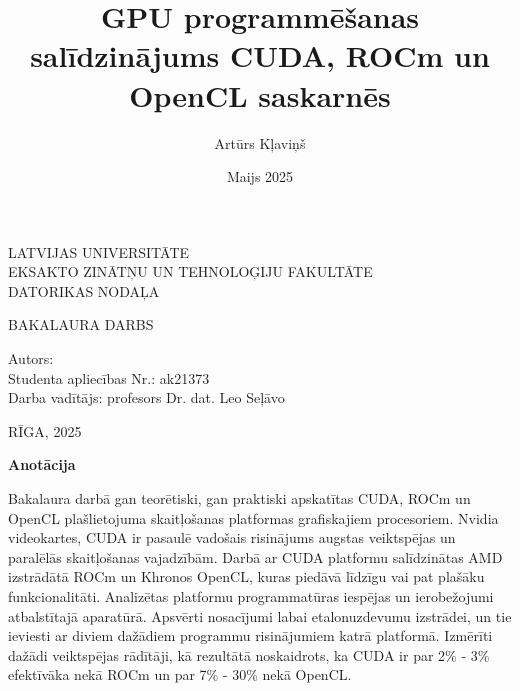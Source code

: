 \documentclass[12pt]{report}%
\author{Artūrs Kļaviņš}
\title{GPU programmēšanas salīdzinājums CUDA, ROCm un OpenCL saskarnēs}
\date{Maijs 2025}
\theoremstyle{definition}
\def\degree{Bakalaura darbs}
\def\faculty{Eksakto zinātņu un tehnoloģiju fakultāte}
\def\department{Datorikas nodaļa}
\def\vietlaiks{Rīga, 2025}
\def\supervisor{Darba vadītājs: profesors Dr. dat. Leo Seļāvo}
\def\studaplieciba{ak21373}
\begin{document}
\thispagestyle{empty}
\makeatletter
   \begin{center}
       \vspace*{1cm}
        
    \vspace{10mm}
    {\Large LATVIJAS UNIVERSITĀTE\\
    \MakeUppercase{\faculty}\\
    \vspace{2mm}
    \MakeUppercase{\department}
    }
    \vspace*{10mm}
    
    
    
    \vspace{5mm}
    {\Large \MakeUppercase{\textbf{\@title}}}
    \vspace{5mm}
    

       \vspace{1cm}
    \Large
    \MakeUppercase{\degree}
    \end{center}
    \vspace{3cm}
    \begin{flushleft}
    \large
       Autors: \textbf{\large \@author}\\
       Studenta apliecības Nr.: \studaplieciba \\
       \supervisor
    \end{flushleft}

       \vfill
     
    \begin{center}
    \Large      
    \MakeUppercase{\vietlaiks}
   \end{center}
\makeatother

\newpage




\thispagestyle{empty}
\noindent \textbf{Anotācija}

\noindent Bakalaura darbā gan teorētiski, gan praktiski apskatītas CUDA, ROCm
un OpenCL  plašlietojuma skaitļošanas platformas grafiskajiem procesoriem.
Nvidia videokartes, CUDA ir pasaulē vadošais risinājums augstas veiktspējas un
paralēlās skaitļošanas vajadzībām. Darbā ar CUDA platformu salīdzinātas AMD
izstrādātā ROCm un Khronos OpenCL, kuras piedāvā līdzīgu vai pat plašāku
funkcionalitāti. Analizētas platformu programmatūras iespējas un ierobežojumi
atbalstītajā aparatūrā. Apsvērti nosacījumi labai etalonuzdevumu izstrādei, un
tie ieviesti ar diviem dažādiem programmu risinājumiem katrā platformā.
Izmērīti dažādi veiktspējas rādītāji, kā rezultātā noskaidrots, ka CUDA ir par
2\% - 3\% efektīvāka nekā ROCm un par 7\% - 30\% nekā OpenCL. 
\end{document}

